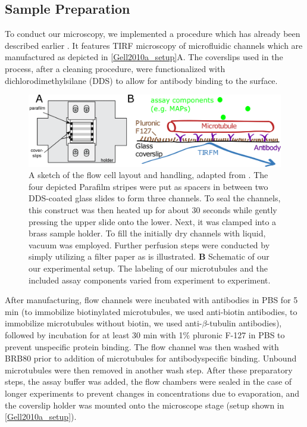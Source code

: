 \subsection{Sample Preparation}
\label{assayPREP}
To conduct our microscopy, we implemented a procedure which has already been described earlier \parencite{Gell2010a}. It features TIRF microscopy of microfluidic channels which are manufactured as depicted in \autoref{Gell2010a_setup}A. The coverslips used in the process, after a cleaning procedure, were functionalized with dichlorodimethylsilane (DDS) to allow for antibody binding to the surface.
\begin{figure}[htb]
\centering
\includegraphics[scale=1.1]{Figures/setup.png}
\caption[The flow cell layout and handling, adapted from \parencite{Gell2010a}]{
		A sketch of the flow cell layout and handling, adapted from \parencite{Gell2010a}. The four depicted Parafilm stripes were put as spacers in between two DDS-coated glass slides to form three channels. To seal the channels, this construct was then heated up for about 30 seconds while gently pressing the upper slide onto the lower. Next, it was clamped into a brass sample holder. To fill the initially dry channels with liquid, vacuum was employed. Further perfusion steps were conducted by simply utilizing a filter paper as is illustrated. \textbf{B} Schematic of our our experimental setup. The labeling of our microtubules and the included assay components varied from experiment to experiment. 
	}\label{Gell2010a_setup}
\end{figure}
After manufacturing, flow channels were incubated with antibodies in PBS for 5 min (to immobilize biotinylated microtubules, we used anti-biotin antibodies, to immobilize microtubules without biotin, we used anti-$\beta$-tubulin antibodies), followed by incubation for at least 30 min with 1\% pluronic F-127 in PBS to prevent unspecific protein binding. The flow channel was then washed with BRB80 prior to addition of microtubules for antibodyspecific binding. Unbound microtubules were then removed in another wash step. After these preparatory steps, the assay buffer was added, the flow chambers were sealed in the case of longer experiments to prevent changes in concentrations due to evaporation, and the coverslip holder was mounted onto the microscope stage (setup shown in \autoref{Gell2010a_setup}).

